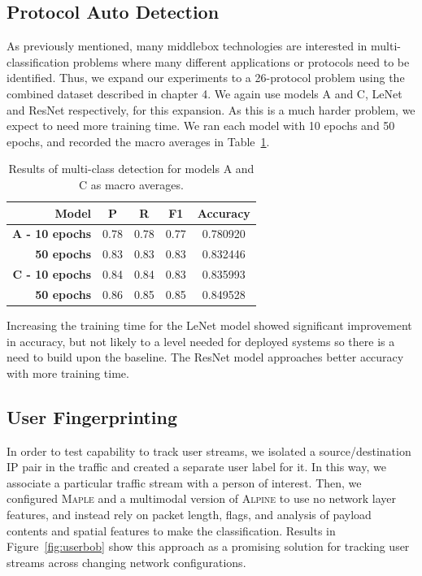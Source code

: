 \subsection{Protocol Auto Detection}

As previously mentioned, many middlebox technologies are interested in multi-classification problems where many different applications or protocols need to be identified. Thus, we expand our experiments to a 26-protocol problem using the combined dataset described in chapter 4. We again use models A and C, LeNet and ResNet respectively, for this expansion. As this is a much harder problem, we expect to need more training time. We ran each model with 10 epochs and 50 epochs, and recorded the macro averages in Table~\ref{tab:multiresults}.

\begin{table} [h!]
\centering
\begin{tabular}{| r | c | c | c | c |}
\hline
Model & P & R & F1 & Accuracy \\
\hline
\textbf{A - 10 epochs} & 0.78 & 0.78 & 0.77 & 0.780920\\
\textbf{50 epochs} & 0.83 & 0.83 & 0.83 & 0.832446 \\
\hline
\textbf{C - 10 epochs} & 0.84 & 0.84 & 0.83 & 0.835993 \\
\textbf{50 epochs} & 0.86 & 0.85 & 0.85 & 0.849528\\
\hline
\end{tabular}
\caption{Results of multi-class detection for models A and C as macro averages.}
\label{tab:multiresults}
\end{table}

Increasing the training time for the LeNet model showed significant improvement in accuracy, but not likely to a level needed for deployed systems so there is a need to build upon the baseline. The ResNet model approaches better accuracy with more training time.

\subsection{User Fingerprinting}
In order to test capability to track user streams, we isolated a source/destination IP pair in the traffic and created a separate user label for it. In this way, we associate a particular traffic stream with a person of interest. Then, we configured \textsc{Maple} and a multimodal version of \textsc{Alpine} to use no network layer features, and instead rely on packet length, flags, and analysis of payload contents and spatial features to make the classification. Results in Figure~\ref{fig:userbob} show this approach as a promising solution for tracking user streams across changing network configurations.


